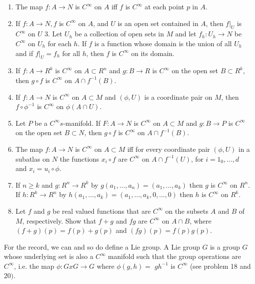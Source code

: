 \documentclass[10pt]{article}
\begin{document}
\begin{enumerate}
  \item The map $f: A \rightarrow N$ is $C^{\infty}$ on $A$ iff $f$ is $C^{\infty}$ at each point $p$ in $A$.

  \item If $f: A \rightarrow N, f$ is $C^{\infty}$ on $A$, and $U$ is an open set contained in $A$, then $\left.f\right|_{U}$ is $C^{\infty}$ on $U$ 3. Let $U_{h}$ be a collection of open sets in $M$ and let $f_{h}: U_{h} \rightarrow N$ be $C^{\infty}$ on $U_{h}$ for each $h$. If $f$ is a function whose domain is the union of all $U_{h}$ and if $\left.f\right|_{U}=f_{h}$ for all $h$, then $f$ is $C^{\infty}$ on its domain.

  \item If $f: A \rightarrow R^{k}$ is $C^{\infty}$ on $A \subset R^{n}$ and $g: B \rightarrow R$ is $C^{\infty}$ on the open set $B \subset R^{k}$, then $g \circ f$ is $C^{\infty}$ on $A \cap f^{-1}(B)$.

  \item If $f: A \rightarrow N$ is $C^{\infty}$ on $A \subset M$ and $(\phi, U)$ is a coordinate pair on $M$, then $f \circ \phi^{-1}$ is $C^{\infty}$ on $\phi(A \cap U)$.

  \item Let $P$ be a $C^{\infty} s$-manifold. If $F: A \rightarrow N$ is $C^{\infty}$ on $A \subset M$ and $g: B \rightarrow P$ is $C^{\infty}$ on the open set $B \subset N$, then $g \circ f$ is $C^{\infty}$ on $A \cap f^{-1}(B)$.

  \item The map $f: A \rightarrow N$ is $C^{\infty}$ on $A \subset M$ iff for every coordinate pair $(\phi, U)$ in a subatlas on $N$ the functions $x_{i} \circ f$ are $C^{\infty}$ on $A \cap f^{-1}(U)$, for $i=1_{0}, \ldots, d$ and $x_{i}=u_{i} \circ \phi$.

  \item If $n \geq k$ and $g: R^{n} \rightarrow R^{k}$ by $g\left(a_{1}, \ldots, a_{n}\right)=\left(a_{1}, \ldots, a_{k}\right)$ then $g$ is $C^{\infty}$ on $R^{n}$. If $h: R^{k} \rightarrow R^{n}$ by $h\left(a_{1}, \ldots, a_{k}\right)=\left(a_{1}, \ldots, a_{k}, 0, \ldots, 0\right)$ then $h$ is $C^{\infty}$ on $R^{k}$.

  \item Let $f$ and $g$ be real valued functions that are $C^{\infty}$ on the subsets $A$ and $B$ of $M$, respectively. Show that $f+g$ and $f g$ are $C^{\infty}$ on $A \cap B$, where $(f+g)(p)=f(p)+g(p)$ and $(f g)(p)=f(p) g(p)$.

\end{enumerate}
For the record, we can and so do define a Lie group. A Lie group $G$ is a group $G$ whose underlying set is also a $C^{\infty}$ manifold such that the group operations are $C^{\infty}$, i.e. the map $\phi: G x G \rightarrow G$ where $\phi(g, h)=$ $g h^{-1}$ is $C^{\infty}$ (see problem 18 and 20$)$.
\end{document}
